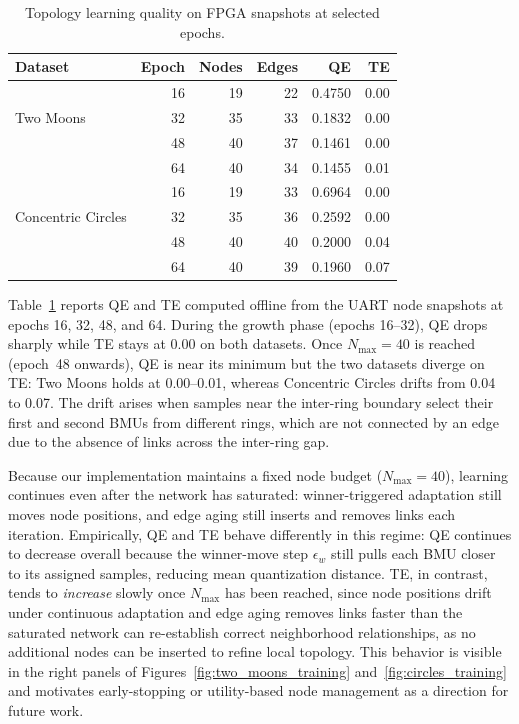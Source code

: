 \documentclass[conference]{IEEEtran}
\begin{document}
\begin{table}[!h]
\centering
\caption{Topology learning quality on FPGA snapshots at selected epochs.}
\label{tab:qe_te}
\footnotesize
\setlength{\tabcolsep}{4pt}
\begin{tabular}{l r r r r r}
\toprule
\textbf{Dataset} & \textbf{Epoch} & \textbf{Nodes} & \textbf{Edges} & \textbf{QE} & \textbf{TE} \\
\midrule
                    & 16 & 19 & 22 & 0.4750 & 0.00 \\
Two Moons           & 32 & 35 & 33 & 0.1832 & 0.00 \\
                    & 48 & 40 & 37 & 0.1461 & 0.00 \\
                    & 64 & 40 & 34 & 0.1455 & 0.01 \\
\midrule
                    & 16 & 19 & 33 & 0.6964 & 0.00 \\
Concentric Circles  & 32 & 35 & 36 & 0.2592 & 0.00 \\
                    & 48 & 40 & 40 & 0.2000 & 0.04 \\
                    & 64 & 40 & 39 & 0.1960 & 0.07 \\
\bottomrule
\end{tabular}
\end{table}

Table~\ref{tab:qe_te} reports QE and TE computed offline from the UART node snapshots at epochs 16, 32, 48, and 64. During the growth phase (epochs 16--32), QE drops sharply while TE stays at 0.00 on both datasets. Once $N_{\max}=40$ is reached (epoch~48 onwards), QE is near its minimum but the two datasets diverge on TE: Two Moons holds at 0.00--0.01, whereas Concentric Circles drifts from 0.04 to 0.07. The drift arises when samples near the inter-ring boundary select their first and second BMUs from different rings, which are not connected by an edge due to the absence of links across the inter-ring gap.

Because our implementation maintains a fixed node budget ($N_{\max}=40$), learning continues even after the network has saturated: winner-triggered adaptation still moves node positions, and edge aging still inserts and removes links each iteration. Empirically, QE and TE behave differently in this regime: QE continues to decrease overall because the winner-move step $\epsilon_w$ still pulls each BMU closer to its assigned samples, reducing mean quantization distance. TE, in contrast, tends to \emph{increase} slowly once $N_{\max}$ has been reached, since node positions drift under continuous adaptation and edge aging removes links faster than the saturated network can re-establish correct neighborhood relationships, as no additional nodes can be inserted to refine local topology. This behavior is visible in the right panels of Figures~\ref{fig:two_moons_training} and~\ref{fig:circles_training} and motivates early-stopping or utility-based node management as a direction for future work.
\end{document}
